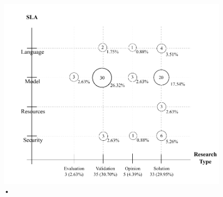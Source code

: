 \begin{figure}[hbtp]
\caption{•}
\centering
\includegraphics[scale=0.7]{figs/bubble-charts/SLA-ResearchType.pdf}
\end{figure}
